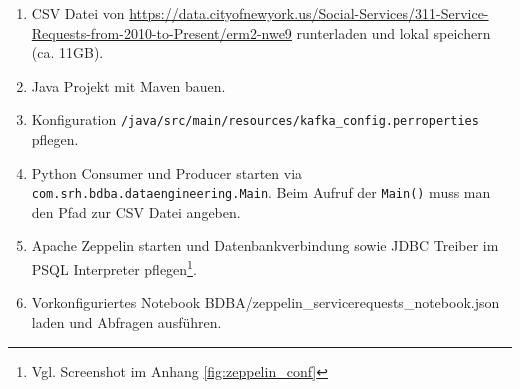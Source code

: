 \begin{enumerate}
	\item CSV Datei von \hyperref[https://data.cityofnewyork.us/Social-Services/311-Service-Requests-from-2010-to-Present/erm2-nwe9]{https://data.cityofnewyork.us/Social-Services/311-Service-Requests-from-2010-to-Present/erm2-nwe9} runterladen und lokal speichern (ca. 11GB).
	\item Java Projekt mit Maven  bauen.
	\item Konfiguration \texttt{/java/src/main/resources/kafka\_config.perroperties} pflegen.
	\item Python Consumer und Producer starten via \texttt{com.srh.bdba.dataengineering.Main}. Beim Aufruf der \texttt{Main()} muss man den Pfad zur CSV Datei angeben.
	\item Apache Zeppelin starten und Datenbankverbindung sowie JDBC Treiber im PSQL Interpreter pflegen\footnote{Vgl. Screenshot im Anhang \ref{fig:zeppelin_conf}}.
	\item Vorkonfiguriertes Notebook BDBA/zeppelin\_servicerequests\_notebook.json laden und Abfragen ausführen.
\end{enumerate}
